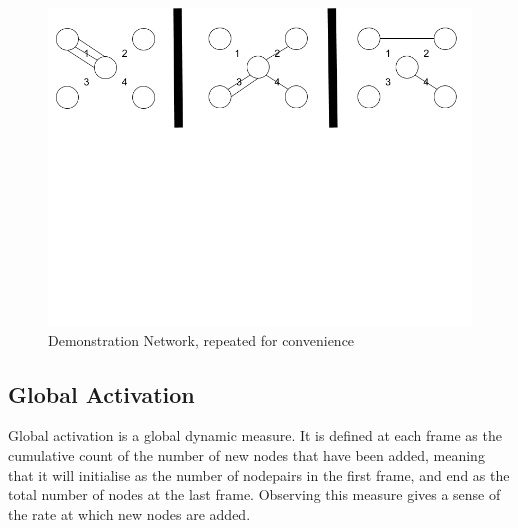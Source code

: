 \begin{figure}[h!]
  \begin{center}
  \includegraphics[trim={0 11cm 0 0}, clip, width=140mm]{./Figures/globalMeasuresReferenceNetwork.png}
  \end{center}
  \caption{Demonstration Network, repeated for convenience}
  \label{fig:demonstrationNetwork2}
\end{figure}







\subsection{Global Activation}
Global activation is a global dynamic measure. It is defined at each frame as the cumulative count of the number of new nodes that have been added, meaning that it will initialise as the number of nodepairs in the first frame, and end as the total number of nodes at the last frame. Observing this measure gives a sense of the rate at which new nodes are added. 


